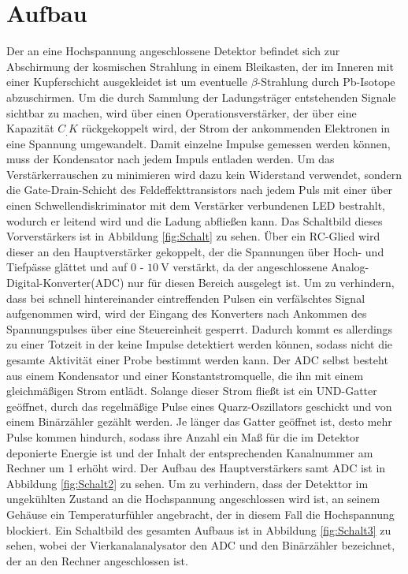 \section{Aufbau}
\label{sec:Aufbau}

Der an eine Hochspannung angeschlossene Detektor befindet sich zur Abschirmung der kosmischen Strahlung in einem Bleikasten, der im Inneren mit einer Kupferschicht ausgekleidet ist um eventuelle $\beta$-Strahlung durch Pb-Isotope abzuschirmen. 
Um die durch Sammlung der Ladungsträger entstehenden Signale sichtbar zu machen, wird über einen Operationsverstärker, der über eine Kapazität $C_.K$ rückgekoppelt wird, der Strom der ankommenden Elektronen in eine Spannung umgewandelt. 
Damit einzelne Impulse gemessen werden können, muss der Kondensator nach jedem Impuls entladen werden. Um das Verstärkerrauschen zu minimieren wird dazu kein Widerstand verwendet, sondern die Gate-Drain-Schicht des Feldeffekttransistors nach jedem Puls mit einer über einen Schwellendiskriminator mit dem Verstärker verbundenen LED bestrahlt, wodurch er leitend wird und die Ladung abfließen kann. Das Schaltbild dieses Vorverstärkers ist in Abbildung \ref{fig:Schalt} zu sehen.
Über ein RC-Glied wird dieser an den Hauptverstärker gekoppelt, der die Spannungen über Hoch- und Tiefpässe glättet und auf $0$ - $\SI{10}{\volt}$ verstärkt, da der angeschlossene Analog-Digital-Konverter(ADC) nur für diesen Bereich ausgelegt ist. Um zu verhindern, dass bei schnell hintereinander eintreffenden Pulsen ein verfälschtes Signal aufgenommen wird, wird der Eingang des Konverters nach Ankommen des Spannungspulses über eine Steuereinheit gesperrt. Dadurch kommt es allerdings zu einer Totzeit in der keine Impulse detektiert werden können, sodass nicht die gesamte Aktivität einer Probe bestimmt werden kann.
Der ADC selbst besteht aus einem Kondensator und einer Konstantstromquelle, die ihn mit einem gleichmäßigen Strom entlädt.
Solange dieser Strom fließt ist ein UND-Gatter geöffnet, durch das regelmäßige Pulse eines Quarz-Oszillators geschickt und von einem Binärzähler gezählt werden.
Je länger das Gatter geöffnet ist, desto mehr Pulse kommen hindurch, sodass ihre Anzahl ein Maß für die im Detektor deponierte Energie ist und der Inhalt der entsprechenden Kanalnummer am Rechner um 1 erhöht wird. Der Aufbau des  Hauptverstärkers samt ADC ist in Abbildung \ref{fig:Schalt2} zu sehen. 
Um zu verhindern, dass der Detekttor im ungekühlten Zustand an die Hochspannung angeschlossen wird ist, an seinem Gehäuse ein Temperaturfühler angebracht, der in diesem Fall die Hochspannung blockiert. Ein Schaltbild des gesamten Aufbaus ist in Abbildung \ref{fig:Schalt3} zu sehen, wobei der Vierkanalanalysator den ADC und den Binärzähler bezeichnet, der an den Rechner angeschlossen ist.

